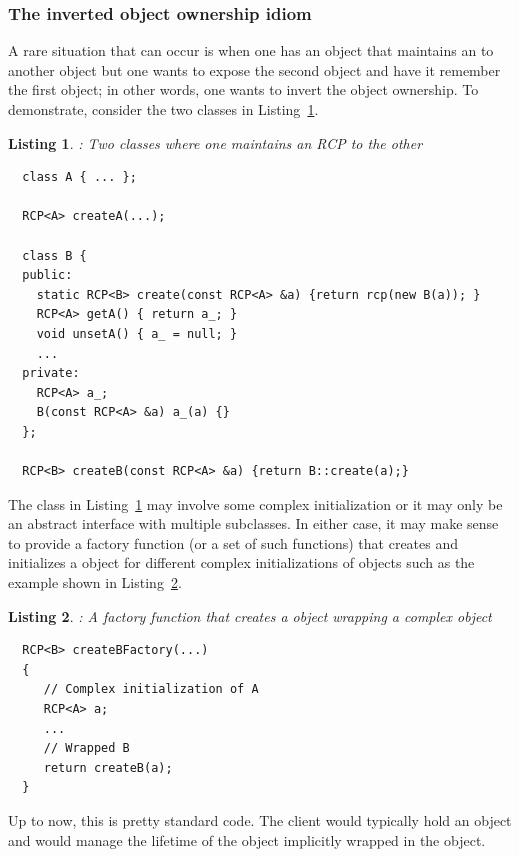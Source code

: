 \documentclass[pdf,ps2pdf,11pt]{SANDreport}
\newtheorem{listing}{Listing}
\begin{document}
%
{}\subsubsection{The inverted object ownership idiom}
\label{sec:inverting-obj-ownership}
%

A rare situation that can occur is when one has an object that
maintains an {} to another object but one wants to expose the
second object and have it remember the first object; in other words,
one wants to invert the object ownership.  To demonstrate, consider
the two classes in Listing~\ref{listing:B_owns_A_decl}.

\begin{listing}: Two classes where one maintains an RCP to the other \\
\label{listing:B_owns_A_decl}
{\small\begin{verbatim}
  class A { ... };

  RCP<A> createA(...);

  class B {
  public:
    static RCP<B> create(const RCP<A> &a) {return rcp(new B(a)); }
    RCP<A> getA() { return a_; }
    void unsetA() { a_ = null; }
    ...
  private:
    RCP<A> a_;
    B(const RCP<A> &a) a_(a) {}
  };

  RCP<B> createB(const RCP<A> &a) {return B::create(a);}
\end{verbatim}}
\end{listing}

The class {} in Listing~\ref{listing:B_owns_A_decl} may involve
some complex initialization or it may only be an abstract interface
with multiple subclasses.  In either case, it may make sense to
provide a factory function (or a set of such functions) that creates
and initializes a {} object for different complex
initializations of {} objects such as the example shown in
Listing~\ref{listing:createBFactory}.

\begin{listing}: A factory function that creates a {} object
wrapping a complex {} object \\
\label{listing:createBFactory}
{\small\begin{verbatim}
  RCP<B> createBFactory(...)
  {
     // Complex initialization of A
     RCP<A> a;
     ...
     // Wrapped B
     return createB(a);
  }
\end{verbatim}}
\end{listing}

Up to now, this is pretty standard code.  The client would typically
hold an {} object and would manage the lifetime of the
{} object implicitly wrapped in the {} object.
\end{document}
